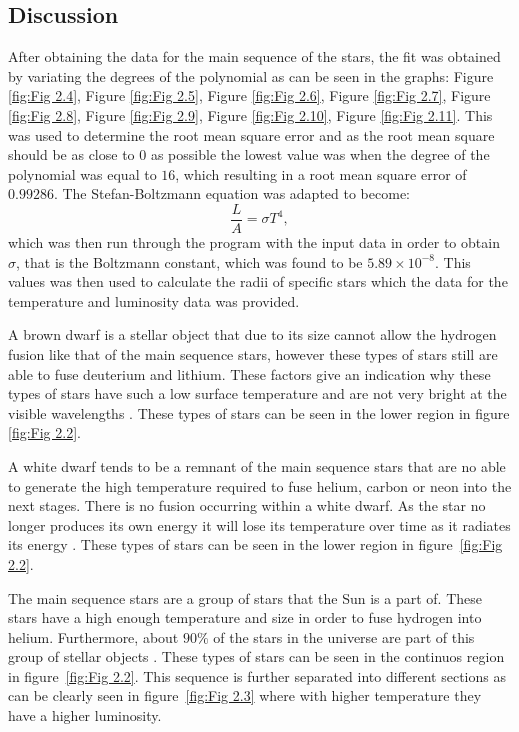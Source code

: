\documentclass[12pt, a4paper]{article}
\begin{document}
\subsection{Discussion}
After obtaining the data for the main sequence of the stars, the fit was obtained by variating the degrees of the polynomial as can be seen in the graphs: Figure \ref{fig:Fig 2.4}, Figure \ref{fig:Fig 2.5}, Figure \ref{fig:Fig 2.6}, Figure \ref{fig:Fig 2.7}, Figure \ref{fig:Fig 2.8}, Figure \ref{fig:Fig 2.9}, Figure \ref{fig:Fig 2.10}, Figure \ref{fig:Fig 2.11}. This was used to determine the root mean square error and as the root mean square should be as close to 0 as possible the lowest value was when the degree of the polynomial was equal to \(16\), which resulting in a root mean square error of \(0.99286\). The Stefan-Boltzmann equation was adapted to become:
\begin{equation}
    \frac{L}{A} = \sigma T^4 ,
\end{equation}
which was then run through the program with the input data in order to obtain \(\sigma\), that is the Boltzmann constant, which was found to be \(5.89 \times 10^{-8}\). This values was then used to calculate the radii of specific stars which the data for the temperature and luminosity data was provided.

A brown dwarf is a stellar object that due to its size cannot allow the hydrogen fusion like that of the main sequence stars, however these types of stars still are able to fuse deuterium and lithium. These factors give an indication why these types of stars have such a low surface temperature and are not very bright at the visible wavelengths \parencite{jaschek1990classification}. These types of stars can be seen in the lower region in figure \ref{fig:Fig 2.2}.

A white dwarf tends to be a remnant of the main sequence stars that are no able to generate the high temperature required to fuse helium, carbon or neon into the next stages. There is no fusion occurring within a white dwarf. As the star no longer produces its own energy it will lose its temperature over time as it radiates its energy \parencite{hoyle1955evolution}. These types of stars can be seen in the lower region in figure~\ref{fig:Fig 2.2}.

The main sequence stars are a group of stars that the Sun is a part of. These stars have a high enough temperature and size in order to fuse hydrogen into helium. Furthermore, about \(90\%\) of the stars in the universe are part of this group of stellar objects \parencite{jaschek1990classification}. These types of stars can be seen in the continuos region in figure~\ref{fig:Fig 2.2}. This sequence is further separated into different sections as can be clearly seen in figure~\ref{fig:Fig 2.3} where with higher temperature they have a higher luminosity.
\end{document}
